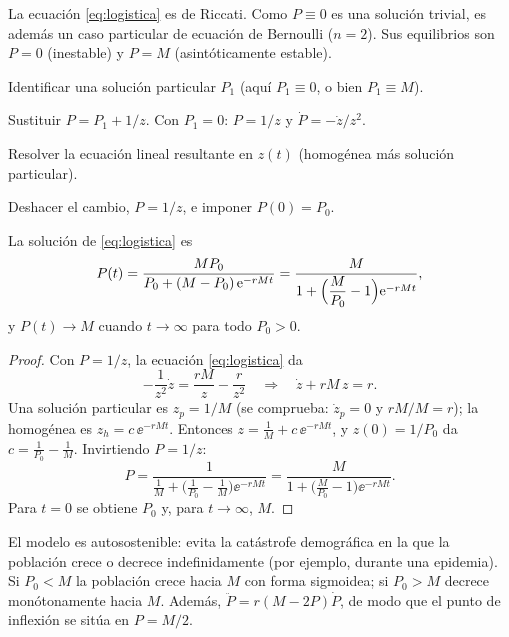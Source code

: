 La ecuación \eqref{eq:logistica} es de Riccati. Como $P\equiv 0$ es una solución trivial, es además un caso particular de ecuación de Bernoulli ($n=2$). Sus equilibrios son $P=0$ (inestable) y $P=M$ (asintóticamente estable).

\begin{algoritmo}
\begin{pasos}
  \item Identificar una solución particular $P_1$ (aquí $P_1\equiv 0$, o bien $P_1\equiv M$).
  \item Sustituir $P=P_1+1/z$. Con $P_1=0$: $P=1/z$ y $\dot P=-\dot z/z^2$.
  \item Resolver la ecuación lineal resultante en $z(t)$ (homogénea más solución particular).
  \item Deshacer el cambio, $P=1/z$, e imponer $P(0)=P_0$.
\end{pasos}
\end{algoritmo}

\begin{proposition}\label{prop:logistica}
La solución de \eqref{eq:logistica} es
\begin{equation}
  P(t) = \frac{M P_0}{P_0 + (M-P_0)\,\mathrm{e}^{-rMt}} = \frac{M}{1+\Bigl(\dfrac{M}{P_0}-1\Bigr)\mathrm{e}^{-rMt}},
  \label{eq:logistica-sol}
\end{equation}
y $P(t)\to M$ cuando $t\to\infty$ para todo $P_0>0$.
\end{proposition}

\begin{proof}
Con $P=1/z$, la ecuación \eqref{eq:logistica} da
\[
  -\frac{1}{z^2}\dot z = \frac{rM}{z}-\frac{r}{z^2}
  \quad\Longrightarrow\quad
  \dot z + rM\,z = r.
\]
Una solución particular es $z_p=1/M$ (se comprueba: $\dot z_p=0$ y $rM/M=r$); la homogénea es $z_h=c\,\ee^{-rMt}$. Entonces $z=\tfrac1M + c\,\ee^{-rMt}$, y
$z(0)=1/P_0$ da $c=\tfrac1{P_0}-\tfrac1M$. Invirtiendo $P=1/z$:
\[
  P=\frac{1}{\tfrac1M+\bigl(\tfrac1{P_0}-\tfrac1M\bigr)\ee^{-rMt}}
   =\frac{M}{1+\bigl(\tfrac{M}{P_0}-1\bigr)\ee^{-rMt}}.
\]
Para $t=0$ se obtiene $P_0$ y, para $t\to\infty$, $M$.
\end{proof}

\begin{remark}
El modelo es autosostenible: evita la catástrofe demográfica en la que la población crece o decrece indefinidamente (por ejemplo, durante una epidemia). Si $P_0<M$ la población crece hacia $M$ con forma sigmoidea; si $P_0>M$ decrece monótonamente hacia $M$. Además, $\ddot P = r(M-2P)\dot P$, de modo que el punto de inflexión se sitúa en $P=M/2$.
\end{remark}

